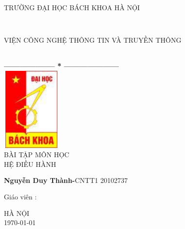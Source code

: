 \documentclass[a4paper,12pt]{report}
\begin{document}
\thispagestyle{empty}
\thisfancypage{
\setlength{\fboxsep}{0pt}
\fbox}{} 
\begin{center}
    \begin{large}
        \textcolor[rgb]{1.00,0.00,0.00}{TRƯỜNG ĐẠI HỌC BÁCH KHOA HÀ NỘI}
    \end{large} \\
    \begin{large}
        \textcolor[rgb]{1.00,0.00,0.00}{VIỆN CÔNG NGHỆ THÔNG TIN VÀ TRUYỀN THÔNG}
    \end{large} \\

    \textbf{--------------------  *  ---------------------}\\[2cm]

    \includegraphics[width=3cm, height=4.2cm]{logo}\\[1cm]
    {\fontsize{32pt}{1}\selectfont BÀI TẬP MÔN HỌC}\\
    {\fontsize{20pt}{1}\selectfont HỆ ĐIỀU HÀNH}\\[2cm]
\end{center}

\begin{flushright}
    \parbox[t]{8cm}{
    \textbf{Nguyễn Duy Thành-}CNTT1 20102737\\}%
\end{flushright}

\hspace{5cm} Giáo viên\hspace{24pt} :
\begin{flushright} \textbf{\parbox[t]{8cm}{    
        \textcolor[rgb]{0.00,0.00,1.00}{Phạm Đăng Hải}
        }}
\end{flushright}
    \vspace{2cm}
\begin{center}
        {\fontsize{16pt}{1}\selectfont HÀ NỘI}\\
        {\fontsize{16pt}{1}\today}
\end{center}
\end{document}
